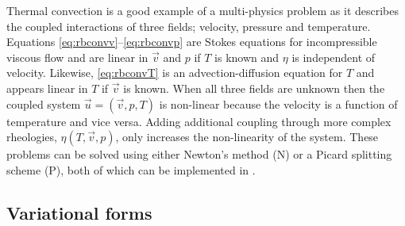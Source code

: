 Thermal convection is a good example of a multi-physics 
problem as it describes the coupled interactions of three fields;
velocity, pressure and temperature. Equations
\eqref{eq:rbconvv}--\eqref{eq:rbconvp} are  Stokes equations for incompressible viscous flow and are linear in $\vec{v}$ and $p$ if $T$ is
known and $\eta$ is independent of velocity.  Likewise,
\eqref{eq:rbconvT} is an advection-diffusion equation for $T$ and
appears linear in $T$ if $\vec{v}$ is known.   When all three fields are unknown then the coupled system $\vec{u}=\left(\vec{v}, p,
T\right)$ is non-linear because the velocity is a function of temperature and vice versa.  Adding additional coupling through more
complex rheologies, $\eta\left(T,\vec{v},p\right)$, only increases the
non-linearity of the system. These problems can be solved using either
Newton's method (N) or a Picard splitting scheme (P), both of which can
be implemented in \TF{}.


\subsection{Variational forms}
\label{sec:variational-forms}

